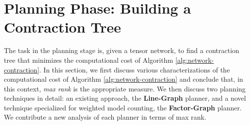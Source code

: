\section{Planning Phase: Building a Contraction Tree}
\label{sec:tensors:planning}
The task in the planning stage is, given a tensor network, to find a contraction tree that minimizes the computational cost of Algorithm \ref{alg:network-contraction}.
In this section, we first discuss various characterizations of the computational cost of Algorithm \ref{alg:network-contraction} and conclude that, in this context, \emph{max rank} is the appropriate measure.
We then discuss two planning techniques in detail: an existing approach, the \textbf{Line-Graph} planner, and a novel technique specialized for weighted model counting, the \textbf{Factor-Graph} planner. We contribute a new analysis of each planner in terms of max rank.






